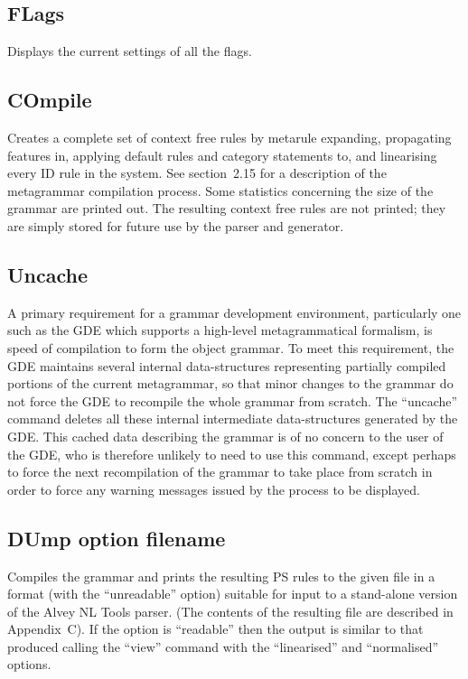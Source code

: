 \subsection{FLags}

Displays the current settings of all the flags.

\subsection{COmpile}

Creates a complete set of context free rules by metarule expanding,
propagating features in, applying default rules and category
statements to, and linearising every ID rule in the system. See
section~2.15 for a description of the metagrammar compilation process.  Some
statistics concerning the size of the grammar are printed out. The
resulting context free rules are not printed; they are simply stored for
future use by the parser and generator.

\subsection{Uncache}

A primary requirement for a grammar development environment, particularly
one such as the GDE which supports a high-level metagrammatical formalism,
is speed of compilation to form the object grammar. To meet this
requirement, the GDE maintains several internal data-structures representing
partially compiled portions of the current metagrammar, so that minor changes
to the grammar do not force the GDE to recompile the whole grammar
from scratch. The ``uncache'' command deletes all these internal
intermediate data-structures generated by the GDE. This cached data
describing the grammar is of no concern to the user of the GDE, who
is therefore unlikely to need to use this command, except perhaps to
force the next recompilation of the grammar to take place from scratch
in order to force any warning messages issued by the process to be
displayed.

\subsection{DUmp option filename}

Compiles the grammar and prints the resulting PS rules to the given file
in a format (with the ``unreadable'' option) suitable for input to a
stand-alone version of the Alvey NL Tools parser. (The contents
of the resulting file are described in Appendix~C). If the option is
``readable'' then the output is similar to that produced calling the
``view'' command with the ``linearised'' and ``normalised'' options.

